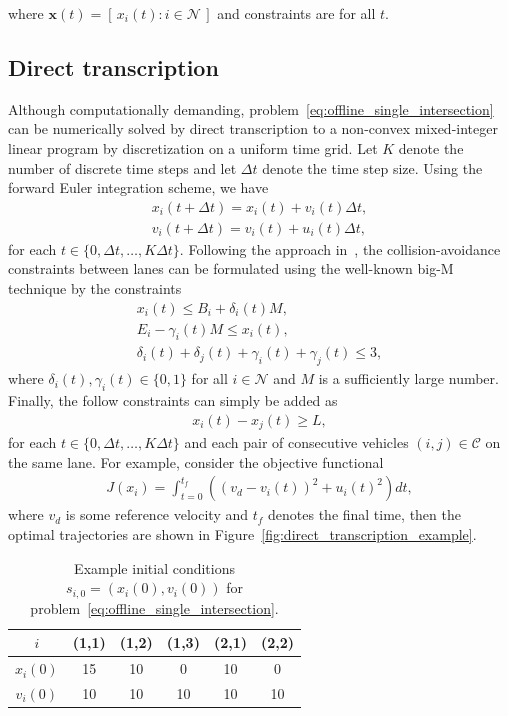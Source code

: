 \documentclass[a4paper]{article}
\theoremstyle{definition}
\theoremstyle{plain}
\begin{document}
where $\mathbf{x}(t) = [\, x_{i}(t) : i \in \mathcal{N} \,]$ and constraints are
for all $t$.


\subsection{Direct transcription}

Although computationally demanding,
problem~\eqref{eq:offline_single_intersection} can be numerically solved by
direct transcription to a non-convex mixed-integer linear program by
discretization on a uniform time grid. Let $K$ denote the number of discrete
time steps and let $\Delta t$ denote the time step size.
%
Using the forward Euler integration scheme, we have
\begin{align*}
  x_{i}(t + \Delta t) = x_{i}(t) + v_{i}(t) \Delta t , \\
  v_{i}(t + \Delta t) = v_{i}(t) + u_{i}(t) \Delta t ,
\end{align*}
for each $t \in \{0, \Delta t, \dots, K \Delta t\}$. Following the approach
in~\cite{hultApproximateSolutionOptimal2015}, the collision-avoidance
constraints between lanes can be formulated using the well-known big-M technique
by the constraints
\begin{align*}
  x_{i}(t) \leq B_{i} + \delta_{i}(t) M , \\
  E_{i} - \gamma_{i}(t) M \leq x_{i}(t) , \\
  \delta_{i}(t) + \delta_{j}(t) + \gamma_{i}(t) + \gamma_{j}(t) \leq 3 ,
\end{align*}
where $\delta_{i}(t), \gamma_{i}(t) \in \{ 0, 1 \}$ for all $i \in \mathcal{N}$ and $M$ is a
sufficiently large number.
%
Finally, the follow constraints can simply be added as
\begin{align*}
  x_{i}(t) - x_{j}(t) \geq L ,
\end{align*}
for each $t \in \{0, \Delta t, \dots, K \Delta t\}$ and each pair of consecutive
vehicles $(i, j) \in \mathcal{C}$ on the same lane.
%
For example, consider the objective functional
\begin{align*}
  J(x_{i}) = \int_{t=0}^{t_{f}} \left( {(v_{d} - v_{i}(t))}^{2} + {u_{i}(t)}^{2} \right) dt ,
\end{align*}
where $v_{d}$ is some reference velocity and $t_{f}$ denotes the final time,
then the optimal trajectories are shown in
Figure~\ref{fig:direct_transcription_example}.

\begin{table}[H]
  \centering
\begin{tabular}{ c | c c c | c c }
  $i$  & (1,1) & (1,2) & (1,3) & (2,1) & (2,2) \\
  \hline
  $x_{i}(0)$ & 15 & 10 &  0 & 10 &  0 \\
  $v_{i}(0)$ & 10 & 10 & 10 & 10 & 10 \\
\end{tabular}
\caption{Example initial conditions $s_{i,0} = (x_{i}(0), v_{i}(0))$ for
  problem~\eqref{eq:offline_single_intersection}.}
\label{tab:hult_parameters}
\end{table}
\end{document}
